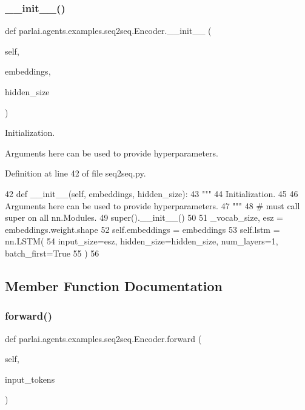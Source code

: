 \subsubsection{\texorpdfstring{\+\_\+\+\_\+init\+\_\+\+\_\+()}{\_\_init\_\_()}}
{\footnotesize\ttfamily def parlai.\+agents.\+examples.\+seq2seq.\+Encoder.\+\_\+\+\_\+init\+\_\+\+\_\+ (\begin{DoxyParamCaption}\item[{}]{self,  }\item[{}]{embeddings,  }\item[{}]{hidden\+\_\+size }\end{DoxyParamCaption})}

\begin{DoxyVerb}Initialization.

Arguments here can be used to provide hyperparameters.
\end{DoxyVerb}
 

Definition at line 42 of file seq2seq.\+py.


\begin{DoxyCode}
42     \textcolor{keyword}{def }\_\_init\_\_(self, embeddings, hidden\_size):
43         \textcolor{stringliteral}{"""}
44 \textcolor{stringliteral}{        Initialization.}
45 \textcolor{stringliteral}{}
46 \textcolor{stringliteral}{        Arguments here can be used to provide hyperparameters.}
47 \textcolor{stringliteral}{        """}
48         \textcolor{comment}{# must call super on all nn.Modules.}
49         super().\_\_init\_\_()
50 
51         \_vocab\_size, esz = embeddings.weight.shape
52         self.embeddings = embeddings
53         self.lstm = nn.LSTM(
54             input\_size=esz, hidden\_size=hidden\_size, num\_layers=1, batch\_first=\textcolor{keyword}{True}
55         )
56 
\end{DoxyCode}


\subsection{Member Function Documentation}
\mbox{\label{classparlai_1_1agents_1_1examples_1_1seq2seq_1_1Encoder_a5d231c02801af8c5155c997111bc803a}} 
\subsubsection{\texorpdfstring{forward()}{forward()}}
{\footnotesize\ttfamily def parlai.\+agents.\+examples.\+seq2seq.\+Encoder.\+forward (\begin{DoxyParamCaption}\item[{}]{self,  }\item[{}]{input\+\_\+tokens }\end{DoxyParamCaption})}

